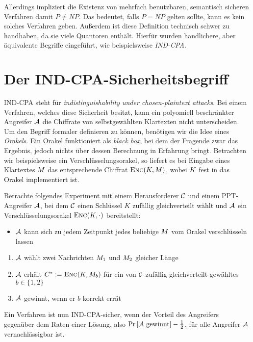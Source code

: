 Allerdings impliziert die Existenz von mehrfach benutzbaren, semantisch sicheren Verfahren damit $P \neq NP$. Das bedeutet, falls $P = NP$ gelten sollte, kann
es kein solches Verfahren geben. Außerdem ist diese Definition technisch schwer zu handhaben, da sie viele Quantoren enthält. Hierfür wurden handlichere, aber äquivalente Begriffe eingeführt, wie beispielsweise \emph{IND-CPA}.

\section{Der IND-CPA-Sicherheitsbegriff}\label{def:ind-cpa}
IND-CPA steht für \emph{indistinguishability under chosen-plaintext attacks}. Bei einem Verfahren, welches diese Sicherheit besitzt, kann ein polyomiell beschränkter Angreifer $\mathcal{A}$ die Chiffrate von selbstgewählten Klartexten nicht unterscheiden. Um den Begriff formaler definieren zu können, benötigen wir die Idee eines \emph{Orakels}. Ein Orakel funktioniert als \emph{black box}, bei dem der Fragende zwar das Ergebnis, jedoch nichts über dessen Berechnung in Erfahrung bringt. Betrachten wir beispielsweise ein Verschlüsselungsorakel, so liefert es bei Eingabe eines Klartextes $M$ das entsprechende Chiffrat $\textsc{Enc}(K, M)$, wobei $K$ fest in das Orakel implementiert ist.
\begin{definition}
	Betrachte folgendes Experiment mit einem Herausforderer $\mathcal{C}$ und einem PPT-Angreifer $\mathcal{A}$, bei dem $\mathcal{C}$ einen Schlüssel $K$ zufällig gleichverteilt wählt und $\mathcal{A}$ ein Verschlüsselungsorakel $\textsc{Enc}(K,\cdot)$ bereitstellt: 
	\begin{itemize}
		\item $\mathcal{A}$ kann sich zu jedem Zeitpunkt jedes beliebige $M$ vom Orakel verschlüsseln lassen
	\end{itemize}
	\begin{enumerate}
		\item $\mathcal{A}$ wählt zwei Nachrichten $M_1$ und $M_2$ gleicher Länge
		\item $\mathcal{A}$ erhält $C^{*} := \textsc{Enc}(K, M_{b})$ für ein von $\mathcal{C}$ zufällig gleichverteilt gewähltes $b \in \{1, 2\}$
		\item $\mathcal{A}$ gewinnt, wenn er $b$ korrekt errät
	\end{enumerate}
	Ein Verfahren ist nun IND-CPA-sicher, wenn der Vorteil des Angreifers gegenüber dem Raten einer Lösung, also $\Pr \left[ \mathcal{A} \textnormal{ gewinnt} \right] - \frac{1}{2}$, für alle Angreifer $\mathcal{A}$ vernachlässigbar ist. 
\end{definition}
